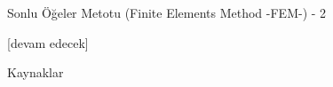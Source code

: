 \documentclass[12pt,fleqn]{article}\usepackage{../../common}
\begin{document}
Sonlu Öğeler Metotu (Finite Elements Method -FEM-) - 2







[devam edecek]

Kaynaklar
\end{document}
